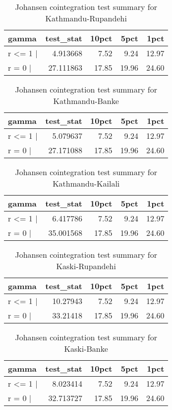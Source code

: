 \documentclass[12pt,]{article}
\begin{document}
\begin{longtable}[t]{lrrrr}
\caption{\label{tab:wheat-cajo-test}Johansen cointegration test summary for Kathmandu-Rupandehi}\\
\toprule
gamma & test\_stat & 10pct & 5pct & 1pct\\
\midrule
r <= 1 | & 4.913668 & 7.52 & 9.24 & 12.97\\
r = 0  | & 27.111863 & 17.85 & 19.96 & 24.60\\
\bottomrule
\end{longtable}

\begin{longtable}[t]{lrrrr}
\caption{\label{tab:wheat-cajo-test}Johansen cointegration test summary for Kathmandu-Banke}\\
\toprule
gamma & test\_stat & 10pct & 5pct & 1pct\\
\midrule
r <= 1 | & 5.079637 & 7.52 & 9.24 & 12.97\\
r = 0  | & 27.171088 & 17.85 & 19.96 & 24.60\\
\bottomrule
\end{longtable}

\begin{longtable}[t]{lrrrr}
\caption{\label{tab:wheat-cajo-test}Johansen cointegration test summary for Kathmandu-Kailali}\\
\toprule
gamma & test\_stat & 10pct & 5pct & 1pct\\
\midrule
r <= 1 | & 6.417786 & 7.52 & 9.24 & 12.97\\
r = 0  | & 35.001568 & 17.85 & 19.96 & 24.60\\
\bottomrule
\end{longtable}

\begin{longtable}[t]{lrrrr}
\caption{\label{tab:wheat-cajo-test}Johansen cointegration test summary for Kaski-Rupandehi}\\
\toprule
gamma & test\_stat & 10pct & 5pct & 1pct\\
\midrule
r <= 1 | & 10.27943 & 7.52 & 9.24 & 12.97\\
r = 0  | & 33.21418 & 17.85 & 19.96 & 24.60\\
\bottomrule
\end{longtable}

\begin{longtable}[t]{lrrrr}
\caption{\label{tab:wheat-cajo-test}Johansen cointegration test summary for Kaski-Banke}\\
\toprule
gamma & test\_stat & 10pct & 5pct & 1pct\\
\midrule
r <= 1 | & 8.023414 & 7.52 & 9.24 & 12.97\\
r = 0  | & 32.713727 & 17.85 & 19.96 & 24.60\\
\bottomrule
\end{longtable}
\end{document}
